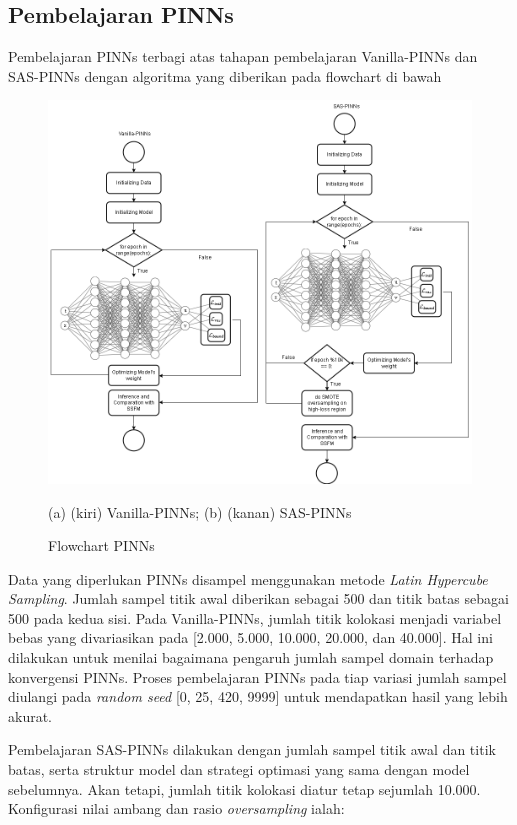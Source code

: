 \newpage
\subsection{Pembelajaran PINNs}

Pembelajaran PINNs terbagi atas tahapan pembelajaran Vanilla-PINNs dan SAS-PINNs dengan algoritma yang diberikan pada flowchart di bawah

\begin{figure}[htbp]
    \centering
    \includegraphics[width=1\linewidth]{Gambar/PINN-Diagram.png}
    \caption{Flowchart PINNs}
    (a) (kiri) Vanilla-PINNs; (b) (kanan) SAS-PINNs
    \label{fig:enter-label}
\end{figure}

Data yang diperlukan PINNs disampel menggunakan metode \emph{Latin Hypercube Sampling}. Jumlah sampel titik awal diberikan sebagai 500 dan titik batas sebagai 500 pada kedua sisi. Pada Vanilla-PINNs, jumlah titik kolokasi menjadi variabel bebas yang divariasikan pada [2.000, 5.000, 10.000, 20.000, dan 40.000]. Hal ini dilakukan untuk menilai bagaimana pengaruh jumlah sampel domain terhadap konvergensi PINNs. Proses pembelajaran PINNs pada tiap variasi jumlah sampel diulangi pada \emph{random seed} [0, 25, 420, 9999] untuk mendapatkan hasil yang lebih akurat. 

Pembelajaran SAS-PINNs dilakukan dengan jumlah sampel titik awal dan titik batas, serta struktur model dan strategi optimasi yang sama dengan model sebelumnya. Akan tetapi, jumlah titik kolokasi diatur tetap sejumlah 10.000. Konfigurasi nilai ambang dan rasio \emph{oversampling} ialah: 

